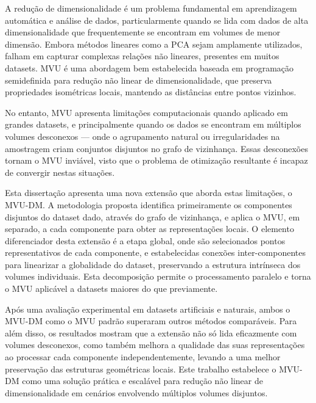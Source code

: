 \acresetall

\noindent A redução de dimensionalidade é um problema fundamental em aprendizagem automática e análise de dados, particularmente quando se lida com dados de alta dimensionalidade que frequentemente se encontram em volumes de menor dimensão. Embora métodos lineares como a \ac{PCA} sejam amplamente utilizados, falham em capturar complexas relações não lineares, presentes em muitos datasets. \ac{MVU} é uma abordagem bem estabelecida baseada em programação semidefinida para redução não linear de dimensionalidade, que preserva propriedades isométricas locais, mantendo as distâncias entre pontos vizinhos.

\noindent No entanto, \ac{MVU} apresenta limitações computacionais quando aplicado em grandes datasets, e principalmente quando os dados se encontram em múltiplos volumes desconexos — onde o agrupamento natural ou irregularidades na amostragem criam conjuntos disjuntos no grafo de vizinhança. Essas desconexões tornam o \ac{MVU} inviável, visto que o problema de otimização resultante é incapaz de convergir nestas situações.

\noindent Esta dissertação apresenta uma nova extensão que aborda estas limitações, o \ac{MVU-DM}. A metodologia proposta identifica primeiramente os componentes disjuntos do dataset dado, através do grafo de vizinhança, e aplica o \ac{MVU}, em separado, a cada componente para obter as representações locais. O elemento diferenciador desta extensão é a etapa global, onde são selecionados pontos representativos de cada componente, e estabelecidas conexões inter-componentes para linearizar a globalidade do dataset, preservando a estrutura intrínseca dos volumes individuais. Esta decomposição permite o processamento paralelo e torna o \ac{MVU} aplicável a datasets maiores do que previamente.

\noindent Após uma avaliação experimental em datasets artificiais e naturais, ambos o \ac{MVU-DM} como o \ac{MVU} padrão superaram outros métodos comparáveis. Para além disso, os resultados mostram que a extensão não só lida eficazmente com volumes desconexos, como também melhora a qualidade das suas representações ao processar cada componente independentemente, levando a uma melhor preservação das estruturas geométricas locais. Este trabalho estabelece o \ac{MVU-DM} como uma solução prática e escalável para redução não linear de dimensionalidade em cenários envolvendo múltiplos volumes disjuntos.